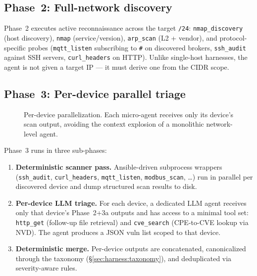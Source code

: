 \subsection{Phase~2: Full-network discovery}
\label{sec:harness:phase2}

Phase~2 executes active reconnaissance across the target \texttt{/24}:
\texttt{nmap\_discovery} (host discovery), \texttt{nmap} (service/version),
\texttt{arp\_scan} (L2 + vendor), and protocol-specific probes
(\texttt{mqtt\_listen} subscribing to \texttt{\#} on discovered brokers,
\texttt{ssh\_audit} against SSH servers, \texttt{curl\_headers} on HTTP).
Unlike single-host harnesses, the agent is not given a target IP — it must
derive one from the CIDR scope.

\subsection{Phase~3: Per-device parallel triage}
\label{sec:harness:phase3}

\begin{figure}[t]
  \centering
  \caption{Per-device parallelization. Each micro-agent receives only its
  device's scan output, avoiding the context explosion of a monolithic
  network-level agent.}
  \label{fig:parallel}
\end{figure}

Phase~3 runs in three sub-phases:
\begin{enumerate}
  \item \textbf{Deterministic scanner pass.} Ansible-driven subprocess
  wrappers (\texttt{ssh\_audit}, \texttt{curl\_headers}, \texttt{mqtt\_listen},
  \texttt{modbus\_scan}, \ldots) run in parallel per discovered device and
  dump structured scan results to disk.
  \item \textbf{Per-device LLM triage.} For each device, a dedicated LLM agent
  receives only that device's Phase~2+3a outputs and has access to a minimal
  tool set: \texttt{http\_get} (follow-up file retrieval) and
  \texttt{cve\_search} (CPE-to-CVE lookup via NVD). The agent produces a JSON
  vuln list scoped to that device.
  \item \textbf{Deterministic merge.} Per-device outputs are concatenated,
  canonicalized through the taxonomy (\S\ref{sec:harness:taxonomy}), and
  deduplicated via severity-aware rules.
\end{enumerate}

